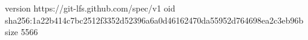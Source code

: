 version https://git-lfs.github.com/spec/v1
oid sha256:1a22b414c7bc2512f3352d52396a6a0d46162470da55952d764698ea2c3eb96b
size 5566
